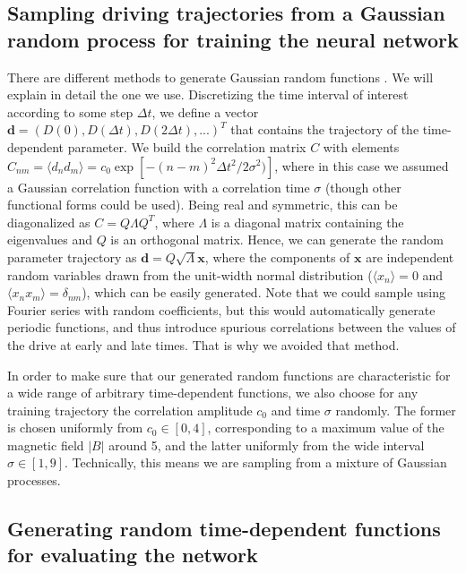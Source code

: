 \documentclass[a4paper,aps,amsmath,amssymb,twocolumn,longbibliography,,accepted=2022-05-17]{quantumarticle}
\begin{document}
\subsection{Sampling driving trajectories from a Gaussian random process for training the neural network}
There are different methods to generate  Gaussian random functions \cite{liu2019advances}. We will explain in detail the one we use. Discretizing the time interval of interest according to some step $\Delta t$, we define a vector $\boldsymbol{d}=(D(0),D(\Delta t),D(2\Delta t),...)^T$ that contains the trajectory of the time-dependent parameter. We build the correlation matrix $C$ with elements $C_{nm}=\langle d_n d_m\rangle=c_0\exp[-(n-m)^2\Delta t^2/2\sigma^2)]$, where in this case we assumed a Gaussian correlation function with a correlation time $\sigma$ (though other functional forms could be used). Being real and symmetric, this can be diagonalized as $C=Q\Lambda Q^T$, where $\Lambda$ is a diagonal matrix containing the eigenvalues and $Q$ is an orthogonal matrix. Hence, we can generate the random parameter trajectory as $\boldsymbol{d}=Q\sqrt{\Lambda}\boldsymbol{x}$, where the components of $\boldsymbol{x}$ are independent random variables drawn from the unit-width normal distribution ($\langle x_n\rangle=0$ and $\langle x_n x_m\rangle=\delta_{nm}$), which can be easily generated. Note that we could sample using Fourier series with random coefficients, but this would automatically generate periodic functions, and thus introduce spurious correlations between the values of the drive at early and late times. That is why we avoided that method.

In order to make sure that our generated random functions are characteristic for a wide range of arbitrary time-dependent functions, we also choose for any training trajectory the correlation amplitude $c_0$ and time $\sigma$ randomly. The former is chosen uniformly from $c_0\in[0,4]$, corresponding to a maximum value of the magnetic field $|B|$ around 5, and the latter uniformly from the wide interval $\sigma \in[1,9]$. Technically, this means we are sampling from a mixture of Gaussian processes.

\subsection{Generating random time-dependent functions for evaluating the network}
\end{document}
